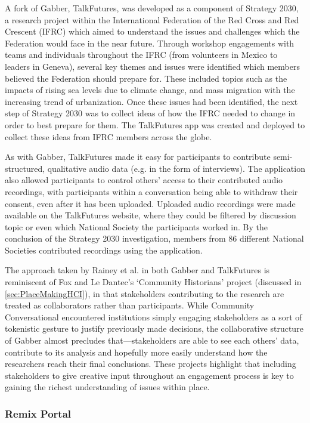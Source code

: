 A fork of Gabber, TalkFutures, was developed as a component of Strategy 2030, a research project within the International Federation of the Red Cross and Red Crescent (IFRC) which aimed to understand the issues and challenges which the Federation would face in the near future. Through workshop engagements with teams and individuals throughout the IFRC (from volunteers in Mexico to leaders in Geneva), several key themes and issues were identified which members believed the Federation should prepare for. These included topics such as the impacts of rising sea levels due to climate change, and mass migration with the increasing trend of urbanization. Once these issues had been identified, the next step of Strategy 2030 was to collect ideas of how the IFRC needed to change in order to best prepare for them. The TalkFutures app was created and deployed to collect these ideas from IFRC members across the globe.

As with Gabber, TalkFutures made it easy for participants to contribute semi-structured, qualitative audio data (e.g. in the form of interviews). The application also allowed participants to control others’ access to their contributed audio recordings, with participants within a conversation being able to withdraw their consent, even after it has been uploaded. Uploaded audio recordings were made available on the TalkFutures website, where they could be filtered by discussion topic or even which National Society the participants worked in. By the conclusion of the Strategy 2030 investigation, members from 86 different National Societies contributed recordings using the application.

The approach taken by Rainey et al. in both Gabber and TalkFutures is reminiscent of Fox and Le Dantec's `Community Historians' project (discussed in \ref{sec:PlaceMakingHCI}), in that stakeholders contributing to the research are treated as collaborators rather than participants. While Community Conversational encountered institutions simply engaging stakeholders as a sort of tokenistic gesture to justify previously made decisions, the collaborative structure of Gabber almost precludes that---stakeholders are able to see each others' data, contribute to its analysis and hopefully more easily understand how the researchers reach their final conclusions. These projects highlight that including stakeholders to give creative input throughout an engagement process is key to gaining the richest understanding of issues within place.

\subsubsection{Remix Portal}


